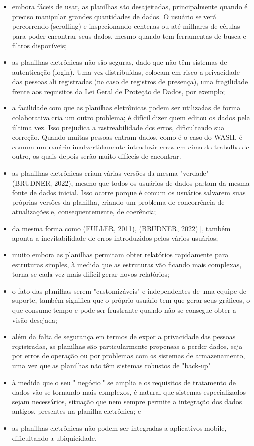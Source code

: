 \begin{itemize}
\item embora fáceis de usar, as planilhas são desajeitadas, principalmente quando é preciso manipular grandes quantidades de dados. O usuário se verá percorrendo (scrolling) e inspecionando centenas ou até milhares de células para poder encontrar seus dados, mesmo quando tem ferramentas de busca e filtros disponíveis;
\item as planilhas eletrônicas não são seguras, dado que não têm sistemas de autenticação (login). Uma vez distribuídas, colocam em risco a privacidade das pessoas ali registradas (no caso de registros de presença), uma fragilidade frente aos requisitos da Lei Geral de Proteção de Dados, por exemplo;
\item a facilidade com que as planilhas eletrônicas podem ser utilizadas de forma colaborativa cria um outro problema; é difícil dizer quem editou os dados pela última vez. Isso prejudica a rastreabilidade dos erros, dificultando sua correção. Quando muitas pessoas entram dados, como é o caso do WASH, é comum um usuário inadvertidamente introduzir erros em cima do trabalho de outro, os quais depois serão muito difíceis de encontrar.
\item as planilhas eletrônicas criam várias versões da mesma "verdade"  (BRUDNER, 2022), mesmo que todos os usuários de dados partam da mesma fonte de dados inicial. Isso ocorre porque é comum os usuários salvarem suas próprias versões da planilha, criando um problema de concorrência de atualizações e, consequentemente, de coerência;
\item da mesma forma como (FULLER, 2011),  (BRUDNER, 2022)]], também aponta a inevitabilidade de erros introduzidos pelos vários usuários;
\item muito embora as planilhas permitam obter relatórios rapidamente para estruturas simples, à medida que as estruturas vão ficando mais complexas, torna-se cada vez mais difícil gerar novos relatórios;
\item o fato das planilhas serem "customizáveis" e independentes de uma equipe de suporte, também significa que o próprio usuário tem que gerar seus gráficos, o que consume tempo e pode ser frustrante quando não se consegue obter a visão desejada;
\item além da falta de segurança em termos de expor a privacidade das pessoas registradas, as planilhas são particularmente propensas a perder dados, seja por erros de operação ou por problemas com os sistemas de armazenamento, uma vez que as planilhas não têm sistemas robustos de "back-up"
\item à medida que o seu " negócio " se amplia e os requisitos de tratamento de dados vão se tornando mais complexos, é natural que sistemas especializados sejam necessários, situação que nem sempre permite a integração dos dados antigos, presentes na planilha eletrônica; e
\item as planilhas eletrônicas não podem ser integradas a aplicativos mobile, dificultando a ubiquicidade.
\end{itemize}

